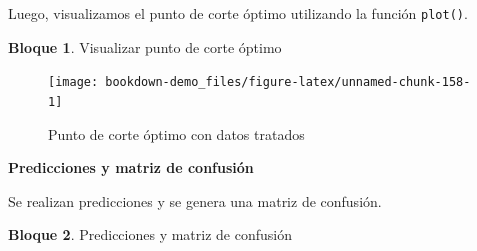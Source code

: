 \documentclass[]{book}
\newenvironment{Shaded}{\begin{snugshade}}{\end{snugshade}}
\newcommand{\DataTypeTok}[1]{\textcolor[rgb]{0.13,0.29,0.53}{#1}}
\newcommand{\DecValTok}[1]{\textcolor[rgb]{0.00,0.00,0.81}{#1}}
\newcommand{\FloatTok}[1]{\textcolor[rgb]{0.00,0.00,0.81}{#1}}
\newcommand{\KeywordTok}[1]{\textcolor[rgb]{0.13,0.29,0.53}{\textbf{#1}}}
\newcommand{\NormalTok}[1]{#1}
\newcommand{\OperatorTok}[1]{\textcolor[rgb]{0.81,0.36,0.00}{\textbf{#1}}}
\newcommand{\OtherTok}[1]{\textcolor[rgb]{0.56,0.35,0.01}{#1}}
\newcommand{\StringTok}[1]{\textcolor[rgb]{0.31,0.60,0.02}{#1}}
\theoremstyle{definition}
\theoremstyle{definition}
\newtheorem{example}{Bloque}[chapter]
\theoremstyle{definition}
\theoremstyle{definition}
\theoremstyle{remark}
\begin{document}
\begin{Shaded}
\end{Shaded}

Luego, visualizamos el punto de corte óptimo utilizando la función \texttt{plot()}.

\begin{example}
\protect\hypertarget{exm:bloque85nbm}{}{\label{exm:bloque85nbm} }Visualizar punto de corte óptimo
\end{example}

\begin{Shaded}
\end{Shaded}

\begin{figure}
\texttt{[image: bookdown-demo\_files/figure-latex/unnamed-chunk-158-1]} \caption{Punto de corte óptimo con datos tratados}\label{fig:unnamed-chunk-158}
\end{figure}

\textbf{Predicciones y matriz de confusión}

Se realizan predicciones y se genera una matriz de confusión.

\begin{example}
\protect\hypertarget{exm:bloque86nbm}{}{\label{exm:bloque86nbm} }Predicciones y matriz de confusión
\end{example}
\end{document}

